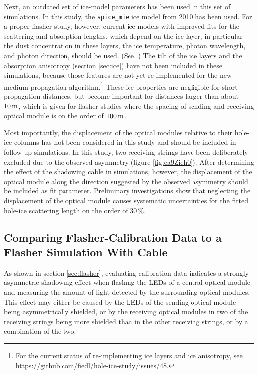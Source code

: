 Next, an outdated set of ice-model parameters has been used in this set
of simulations. In this study, the \texttt{spice\_mie} ice model from
2010 has been used. For a proper flasher study, however, current ice
models with improved fits for the scattering and absorption lengths,
which depend on the ice layer, in particular the dust concentration in
these layers, the ice temperature, photon wavelength, and photon
direction, should be used. (See
\cite{icepaper,flasherdataderivedicemodels}.) The tilt of the ice layers
and the absorption anisotropy (section \ref{sec:ice}) have not been
included in these simulations, because those features are not yet
re-implemented for the new medium-propagation
algorithm.\footnote{For the current status of re-implementing ice layers and ice anisotropy, see \url{https://github.com/fiedl/hole-ice-study/issues/48}.}
These ice properties are negligible for short propagation distances, but
become important for distances larger than about \(10\text{\,m}\), which is
given for flasher studies where the spacing of sending and receiving
optical module is on the order of \(100\text{\,m}\).

Most importantly, the displacement of the optical modules relative to
their hole-ice columns has not been considered in this study and should
be included in follow-up simulations. In this study, two receiving
strings have been deliberately excluded due to the observed asymmetry
(figure \ref{fig:ea9Zieh0}). After determining the effect of the
shadowing cable in simulations, however, the displacement of the optical
module along the direction suggested by the observed asymmetry should be
included as fit parameter. Preliminary investigations show that
neglecting the displacement of the optical module causes systematic
uncertainties for the fitted hole-ice scattering length on the order of
\(30\,\%\).

\subsection{Comparing Flasher-Calibration Data to a Flasher Simulation With Cable}
\label{sec:flasher_with_cable}

As shown in section \ref{sec:flasher}, evaluating calibration data
indicates a strongly asymmetric shadowing effect when flashing the LEDs
of a central optical module and measuring the amount of light detected
by the surrounding optical modules. This effect may either be caused by
the LEDs of the sending optical module being asymmetrically shielded, or
by the receiving optical modules in two of the receiving strings being
more shielded than in the other receiving strings, or by a combination
of the two.

